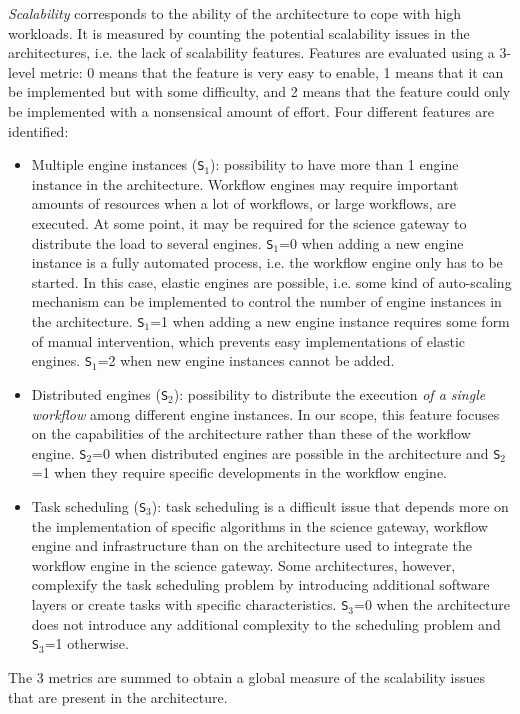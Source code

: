 \documentclass[preprint,3p,twocolumn]{elsarticle}
\begin{document}
\emph{Scalability} corresponds to the ability of the architecture to
cope with high workloads. It is measured by counting the potential
scalability issues in the architectures, i.e. the lack of scalability
features. Features are evaluated using a 3-level metric: 0 means that
the feature is very easy to enable, 1 means that it can be implemented
but with some difficulty, and 2 means that the feature could only be
implemented with a nonsensical amount of effort. Four different
features are identified:
\begin{itemize}[leftmargin=0cm,itemindent=0.35cm,itemsep=0cm]
\item Multiple engine instances (\texttt{S$_1$}): possibility to have
  more than 1 engine instance in the architecture. Workflow engines
  may require important amounts of resources when a lot of workflows,
  or large workflows, are executed. At some point, it may be required
  for the science gateway to distribute the load to several
  engines. \texttt{S$_1$}=0 when adding a new engine instance is a
  fully automated process, i.e. the workflow engine only has to be
  started. In this case, elastic engines are possible, i.e. some kind
  of auto-scaling mechanism can be implemented to control the number
  of engine instances in the architecture. \texttt{S$_1$}=1 when
  adding a new engine instance requires some form of manual
  intervention, which prevents easy implementations of elastic
  engines. \texttt{S$_1$}=2 when new engine instances cannot be added.
\item Distributed engines (\texttt{S$_2$}): possibility to distribute
  the execution \emph{of a single workflow} among different engine
  instances. In our scope, this feature focuses on the capabilities of
  the architecture rather than these of the workflow
  engine. \texttt{S$_2$}=0 when distributed engines are possible in
  the architecture and \texttt{S$_2$}=1 when they require specific
  developments in the workflow engine.
\item Task scheduling (\texttt{S$_3$}): task scheduling is a difficult
  issue that depends more on the implementation of specific algorithms
  in the science gateway, workflow engine and infrastructure than on
  the architecture used to integrate the workflow engine in the
  science gateway. Some architectures, however, complexify the task
  scheduling problem by introducing additional software layers or
  create tasks with specific characteristics. \texttt{S$_3$}=0 when
  the architecture does not introduce any additional complexity to the
  scheduling problem and \texttt{S$_3$}=1 otherwise.
\end{itemize}
The 3 metrics are summed to obtain a global measure of the scalability
issues that are present in the architecture.
\end{document}
